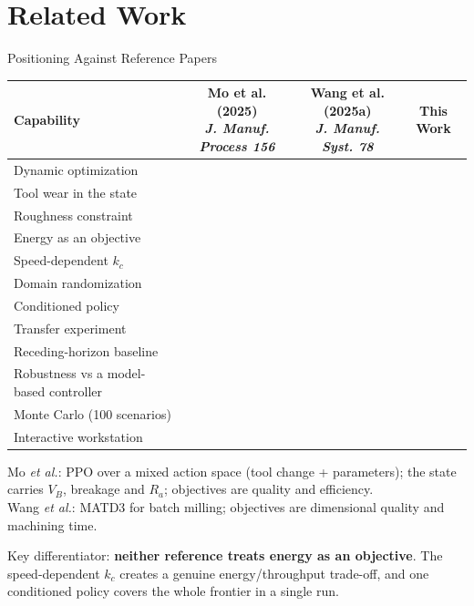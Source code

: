 ﻿\documentclass[11pt,aspectratio=169]{beamer}
\newcommand{\Ra}{R_a}
\newcommand{\VB}{V_B}
\newcommand{\CMark}{\ding{51}}
\newcommand{\XMark}{\ding{55}}
\begin{document}
\section{Related Work}

\begin{frame}{Positioning Against Reference Papers}
    \begin{table}
    \centering
    \label{tab:papers}
    \scriptsize
    \begin{tabular}{@{}lccc@{}}
    \toprule
\textbf{Capability} & \makecell{Mo et al. (2025)\\\textsl{J. Manuf. Process 156}} & \makecell{Wang et al. (2025a)\\\textsl{J. Manuf. Syst. 78}} & \textbf{This Work} \\
    \midrule
    Dynamic optimization & \CMark & \CMark & \CMark \\
    Tool wear in the state & \CMark & \XMark & \CMark \\
    Roughness constraint & \CMark & \XMark & \CMark \\
    Energy as an objective & \XMark & \XMark & \CMark \\
    Speed-dependent $k_c$ & \XMark & \XMark & \CMark \\
    Domain randomization & \XMark & \XMark & \CMark \\
    Conditioned policy & \XMark & \XMark & \CMark \\
    Transfer experiment & \XMark & \XMark & \CMark \\
    Receding-horizon baseline & \XMark & \XMark & \CMark \\
    Robustness vs a model-based controller & \XMark & \XMark & \CMark \\
    Monte Carlo (100 scenarios) & \XMark & \XMark & \CMark \\
    Interactive workstation & \XMark & \XMark & \CMark \\
    \bottomrule
    \end{tabular}
    \end{table}

    \vspace{0.4em}
    \scriptsize
    Mo \emph{et al.}: PPO over a mixed action space (tool change + parameters); the state carries
    $\VB$, breakage and $\Ra$; objectives are quality and efficiency.\\
    Wang \emph{et al.}: MATD3 for batch milling; objectives are dimensional quality and machining time.

    \vspace{0.3em}
    \alert{Key differentiator:} \textbf{neither reference treats energy as an objective}. The
    speed-dependent $k_c$ creates a genuine energy/throughput trade-off, and one conditioned
    policy covers the whole frontier in a single run.
\end{frame}
\end{document}
